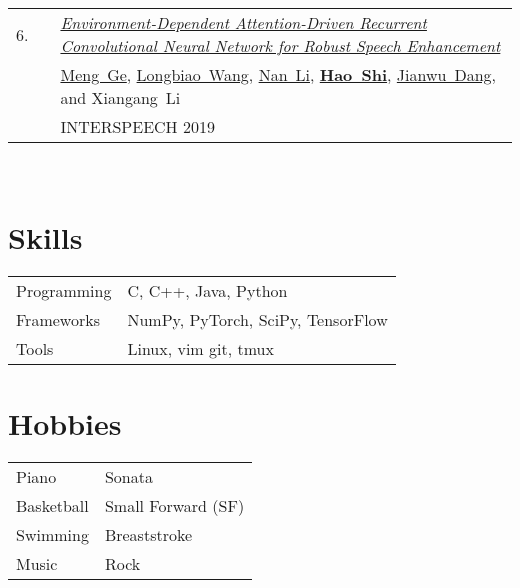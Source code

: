 \documentclass[11pt,letter,sans]{moderncv}
\begin{document}
\begin{minipage}{\textwidth}
\begin{tabular}{R{8mm}p{1mm}L{6.5in}}
 6.\hspace*{1mm} && \textit{\href{https://hshi-speech.github.io/resume/pdf/1477.pdf}{Environment-Dependent Attention-Driven Recurrent Convolutional Neural Network for Robust Speech Enhancement} }  \\
 && \mbox{\href{https://scholar.google.com/citations?user=Ody4GF0AAAAJ}{Meng Ge}}, \mbox{\href{https://scholar.google.com/citations?user=1Z9_5ZgAAAAJ}{Longbiao Wang}}, \mbox{\href{https://scholar.google.com/citations?user=9BVJbdsAAAAJ}{Nan Li}}, \mbox{\textbf{\href{https://scholar.google.com/citations?user=DclFbLwAAAAJ}{Hao Shi}}}, \mbox{\href{https://scholar.google.com/citations?user=Wk5ApskAAAAJ}{Jianwu Dang}}, and \mbox{Xiangang Li} \\
 && INTERSPEECH 2019  \\
\end{tabular} \\[2mm]
\end{minipage}


\section{Skills}
\begin{tabular}{p{1in}p{5in}}
    Programming & C, C++, Java, Python
 \\
    Frameworks & NumPy, PyTorch, SciPy, TensorFlow
 \\
    Tools & Linux, vim git, tmux
 \\
\end{tabular}


\section{Hobbies}
\begin{tabular}{p{1in}p{5in}}
    Piano & Sonata
 \\
    Basketball & Small Forward (SF)
 \\
    Swimming & Breaststroke
 \\
    Music & Rock
 \\
\end{tabular}
\end{document}
